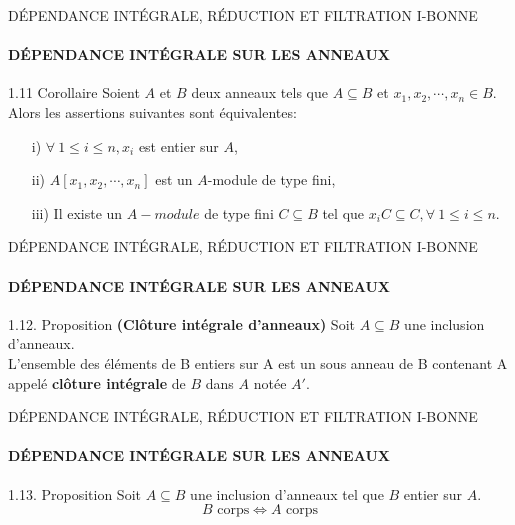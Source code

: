 \documentclass[11pt,a4paper]{beamer}
\begin{document}
\begin{frame}{DÉPENDANCE INTÉGRALE, RÉDUCTION ET FILTRATION I-BONNE}
	\framesubtitle{DÉPENDANCE INTÉGRALE SUR LES ANNEAUX}
	\begin{block}{1.11 Corollaire}
	Soient $A$ et $B$ deux anneaux tels que $A \subseteq  B$ et $x_1, x_2, \cdots, x_n \in B$.\\
	Alors les assertions suivantes sont équivalentes:
\begin{enumerate}
	\item[i)]$\forall \ 1 \leqslant i \leqslant n, x_i$ est entier sur $A$, \pause
	\item[ii)]$A[x_1, x_2, \cdots, x_n]$ est un $A$-module de type fini, \pause
	\item[iii)]Il existe un $A-module$ de type fini $C \subseteq  B$ tel que $x_i C \subseteq  C, \forall \ 1 \leqslant i \leqslant n$.
\end{enumerate}
	\end{block}
\end{frame}

\begin{frame}{DÉPENDANCE INTÉGRALE, RÉDUCTION ET FILTRATION I-BONNE}
	\framesubtitle{DÉPENDANCE INTÉGRALE SUR LES ANNEAUX}
	\begin{block}{1.12. Proposition \textbf{(Clôture intégrale d'anneaux)}}
	Soit $A \subseteq B$ une inclusion d'anneaux.\\
	L'ensemble des éléments de B entiers sur A est un sous anneau de B contenant A appelé \textbf{clôture intégrale} de $B$ dans $A$ notée $A'$.
	\end{block}
\end{frame}

\begin{frame}{DÉPENDANCE INTÉGRALE, RÉDUCTION ET FILTRATION I-BONNE}
	\framesubtitle{DÉPENDANCE INTÉGRALE SUR LES ANNEAUX}
	\begin{block}{1.13. Proposition}
	Soit $A \subseteq B$ une inclusion d'anneaux tel que $B$ entier sur $A$.
	\[ B \text{ corps} \Longleftrightarrow  A \text{ corps} \]
	\end{block}
\end{frame}
\end{document}
